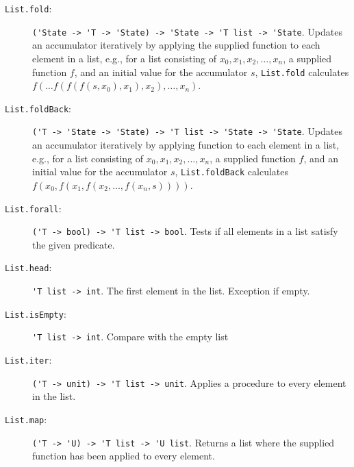\begin{description}
\item[\texttt{List.fold}:] \lstinline{('State -> 'T -> 'State) -> 'State -> 'T list -> 'State}. Updates an accumulator iteratively by applying the supplied function to each element in a list, e.g., for a list consisting of $x_0, x_1, x_2, \ldots, x_n$, a supplied function $f$, and an initial value for the accumulator $s$, \lstinline{List.fold} calculates $f(\ldots f(f(f(s, x_0), x_1), x_2), \dots, x_n)$.
\item[\texttt{List.foldBack}:] \lstinline{('T -> 'State -> 'State) -> 'T list -> 'State -> 'State}. Updates an accumulator iteratively by applying function to each element in a list, e.g., for a list consisting of $x_0, x_1, x_2, \ldots, x_n$, a supplied function $f$, and an initial value for the accumulator $s$, \lstinline{List.foldBack} calculates $f(x_0, f(x_1, f(x_2, \ldots, f(x_n, s))))$.
\item[\texttt{List.forall}:] \lstinline{('T -> bool) -> 'T list -> bool}. Tests if all elements in a list satisfy the given predicate.
\item[\texttt{List.head}:] \lstinline{'T list -> int}. The first element in the list. Exception if empty.
\item[\texttt{List.isEmpty}:]  \lstinline{'T list -> int}. Compare with the empty list
\item[\texttt{List.iter}:] \lstinline{('T -> unit) -> 'T list -> unit}. Applies a procedure to every element in the list.
\item[\texttt{List.map}:] \lstinline{('T -> 'U) -> 'T list -> 'U list}. Returns a list where the supplied function has been applied to every element.

\end{description}
